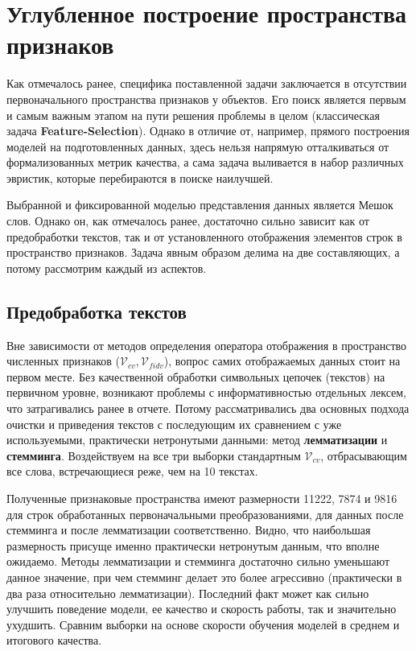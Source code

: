 \documentclass{article}
\begin{document}
\section{Углубленное построение пространства признаков}

    Как отмечалось ранее, специфика поставленной задачи заключается в отсутствии первоначального пространства признаков у объектов. Его поиск является первым и самым важным этапом на пути решения проблемы в целом (классическая задача \textbf{Feature-Selection}). Однако в отличие от, например, прямого построения моделей на подготовленных данных, здесь нельзя напрямую отталкиваться от формализованных метрик качества, а сама задача выливается в набор различных эвристик, которые перебираются в поиске наилучшей.

    Выбранной и фиксированной моделью представления данных является Мешок слов. Однако он, как отмечалось ранее, достаточно сильно зависит как от предобработки текстов, так и от установленного отображения элементов строк в пространство признаков. Задача явным образом делима на две составляющих, а потому рассмотрим каждый из аспектов.

    \subsection{Предобработка текстов}

        Вне зависимости от методов определения оператора отображения в пространство численных признаков ($\mathcal{V}_{cv}, \mathcal{V}_{fidv}$), вопрос самих отображаемых данных стоит на первом месте. Без качественной обработки символьных цепочек (текстов) на первичном уровне, возникают проблемы с информативностью отдельных лексем, что затрагивались ранее в отчете. Потому рассматривались два основных подхода очистки и приведения текстов с последующим их сравнением с уже используемыми, практически нетронутыми данными: метод \textbf{лемматизации} и \textbf{стемминга}. Воздействуем на все три выборки стандартным $\mathcal{V}_{cv}$, отбрасывающим все слова, встречающиеся реже, чем на 10 текстах. 

        Полученные признаковые пространства имеют размерности 11222, 7874 и 9816 для строк обработанных первоначальными преобразованиями, для данных после стемминга и после лемматизации соответственно. Видно, что наибольшая размерность присуще именно практически нетронутым данным, что вполне ожидаемо. Методы лемматизации и стемминга достаточно сильно уменьшают данное значение, при чем стемминг делает это более агрессивно (практически в два раза относительно лемматизации). Последний факт может как сильно улучшить поведение модели, ее качество и скорость работы, так и значительно ухудшить. Сравним выборки на основе скорости обучения моделей в среднем и итогового качества.
\end{document}
